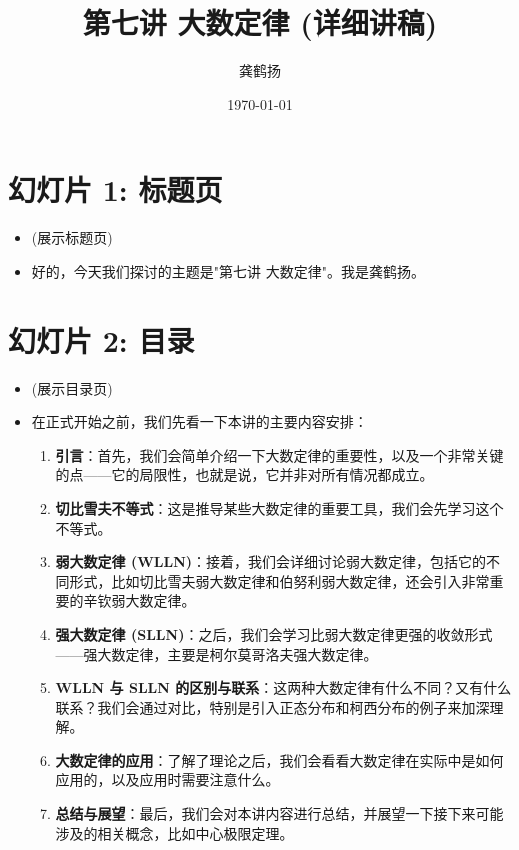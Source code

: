 \documentclass[UTF8]{article} %
\title{第七讲 大数定律 (详细讲稿)}
\author{龚鹤扬}
\date{\today}
\begin{document}
\maketitle
{} %


\section*{幻灯片 1: 标题页}
\begin{itemize}
    \itemsep1em
    \item (展示标题页)
    \item 好的，今天我们探讨的主题是"第七讲 大数定律"。我是龚鹤扬。
\end{itemize}

\section*{幻灯片 2: 目录}
\begin{itemize}
    \itemsep1em
    \item (展示目录页)
    \item 在正式开始之前，我们先看一下本讲的主要内容安排：
    \begin{enumerate}[label=\arabic*., itemsep=0.5em]
        \item \textbf{引言}：首先，我们会简单介绍一下大数定律的重要性，以及一个非常关键的点——它的局限性，也就是说，它并非对所有情况都成立。
        \item \textbf{切比雪夫不等式}：这是推导某些大数定律的重要工具，我们会先学习这个不等式。
        \item \textbf{弱大数定律 (WLLN)}：接着，我们会详细讨论弱大数定律，包括它的不同形式，比如切比雪夫弱大数定律和伯努利弱大数定律，还会引入非常重要的辛钦弱大数定律。
        \item \textbf{强大数定律 (SLLN)}：之后，我们会学习比弱大数定律更强的收敛形式——强大数定律，主要是柯尔莫哥洛夫强大数定律。
        \item \textbf{WLLN 与 SLLN 的区别与联系}：这两种大数定律有什么不同？又有什么联系？我们会通过对比，特别是引入正态分布和柯西分布的例子来加深理解。
        \item \textbf{大数定律的应用}：了解了理论之后，我们会看看大数定律在实际中是如何应用的，以及应用时需要注意什么。
        \item \textbf{总结与展望}：最后，我们会对本讲内容进行总结，并展望一下接下来可能涉及的相关概念，比如中心极限定理。
    \end{enumerate}
\end{itemize}
\end{document}
